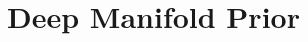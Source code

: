 \def\point{P}
\def\matrix{P}
\def\npoints{N}
\def\nshapes{S}
\def\nbasis{B}
\def\depth{D}
\def\scale{k}
\def\encoding{\mathbf{z}}
\def\mrtnet{MRTNet\xspace}
\def\mrvae{MR-VAE\xspace}
\def\kdtree{kd-tree\xspace}
\def\eg{\emph{e.g.}\xspace}
\def\ie{\emph{i.e.}\xspace}

\chapter{Deep Manifold Prior} %







%
